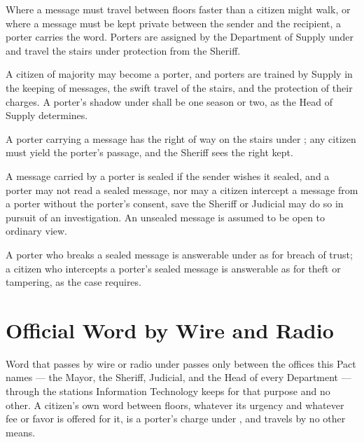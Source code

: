 Where a message must travel between floors faster than a citizen might walk, or where a message must be kept private between the sender and the recipient, a porter carries the word. Porters are assigned by the Department of Supply under  and travel the stairs under protection from the Sheriff.

\begin{clauses}
\item A citizen of majority may become a porter, and porters are trained by Supply in the keeping of messages, the swift travel of the stairs, and the protection of their charges. A porter's shadow under  shall be one season or two, as the Head of Supply determines.
\item A porter carrying a message has the right of way on the stairs under ; any citizen must yield the porter's passage, and the Sheriff sees the right kept.
\item A message carried by a porter is sealed if the sender wishes it sealed, and a porter may not read a sealed message, nor may a citizen intercept a message from a porter without the porter's consent, save the Sheriff or Judicial may do so in pursuit of an investigation. An unsealed message is assumed to be open to ordinary view.
\item A porter who breaks a sealed message is answerable under  as for breach of trust; a citizen who intercepts a porter's sealed message is answerable as for theft or tampering, as the case requires.
\end{clauses}

\section{Official Word by Wire and Radio}
\label{sec:records:official-word-by-wire-and-radio}

Word that passes by wire or radio under  passes only between the offices this Pact names --- the Mayor, the Sheriff, Judicial, and the Head of every Department --- through the stations Information Technology keeps for that purpose and no other. A citizen's own word between floors, whatever its urgency and whatever fee or favor is offered for it, is a porter's charge under , and travels by no other means.

